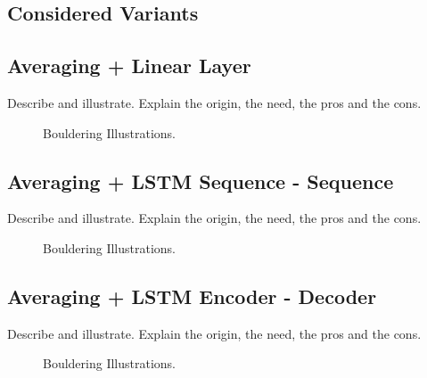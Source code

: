 \subsection*{Considered Variants}

\subsection{\textbf{Averaging + Linear Layer}}
Describe and illustrate. Explain the origin, the need, the pros and the cons.
\begin{figure*}[h]
    \centering
    \caption{Bouldering Illustrations.}
\end{figure*}

\subsection{\textbf{Averaging + LSTM Sequence - Sequence}}
Describe and illustrate. Explain the origin, the need, the pros and the cons.
\begin{figure*}[h]
    \centering
    \caption{Bouldering Illustrations.}
\end{figure*}

\subsection{\textbf{Averaging + LSTM Encoder - Decoder}}
Describe and illustrate. Explain the origin, the need, the pros and the cons.
\begin{figure*}[h]
    \centering
    \caption{Bouldering Illustrations.}
\end{figure*}

